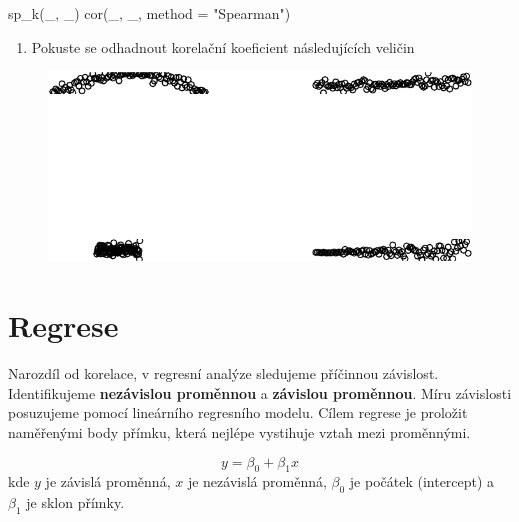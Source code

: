 \documentclass[
  letterpaper,
  DIV=11,
  numbers=noendperiod]{scrreprt}
\newenvironment{Shaded}{\begin{snugshade}}{\end{snugshade}}
\newcommand{\AttributeTok}[1]{\textcolor[rgb]{0.40,0.45,0.13}{#1}}
\newcommand{\FunctionTok}[1]{\textcolor[rgb]{0.28,0.35,0.67}{#1}}
\newcommand{\NormalTok}[1]{\textcolor[rgb]{0.00,0.23,0.31}{#1}}
\newcommand{\StringTok}[1]{\textcolor[rgb]{0.13,0.47,0.30}{#1}}
\providecommand{\tightlist}{%
  \setlength{\itemsep}{0pt}\setlength{\parskip}{0pt}}\usepackage{longtable,booktabs,array}
\begin{document}
\begin{tcolorbox}
\begin{Shaded}
\begin{Highlighting}[]
\FunctionTok{sp\_k}\NormalTok{(\_, \_)}
\FunctionTok{cor}\NormalTok{(\_, \_, }\AttributeTok{method =} \StringTok{"Spearman"}\NormalTok{)}
\end{Highlighting}
\end{Shaded}

\begin{enumerate}
\def\labelenumi{\arabic{enumi}.}
\setcounter{enumi}{2}
\tightlist
\item
  Pokuste se odhadnout korelační koeficient následujících veličin
\end{enumerate}

\begin{figure}[H]

{\centering \includegraphics{11_korelace_regrese_files/figure-pdf/unnamed-chunk-3-1.pdf}

}

\end{figure}

\end{tcolorbox}

\hypertarget{regrese}{%
\section{Regrese}\label{regrese}}

Narozdíl od korelace, v regresní analýze sledujeme příčinnou závislost.
Identifikujeme \textbf{nezávislou proměnnou} a \textbf{závislou
proměnnou}. Míru závislosti posuzujeme pomocí lineárního regresního
modelu. Cílem regrese je proložit naměřenými body přímku, která nejlépe
vystihuje vztah mezi proměnnými.

\[
y = \beta_0 + \beta_1x
\] kde \(y\) je závislá proměnná, \(x\) je nezávislá proměnná,
\(\beta_0\) je počátek (intercept) a \(\beta_1\) je sklon přímky.
\end{document}
